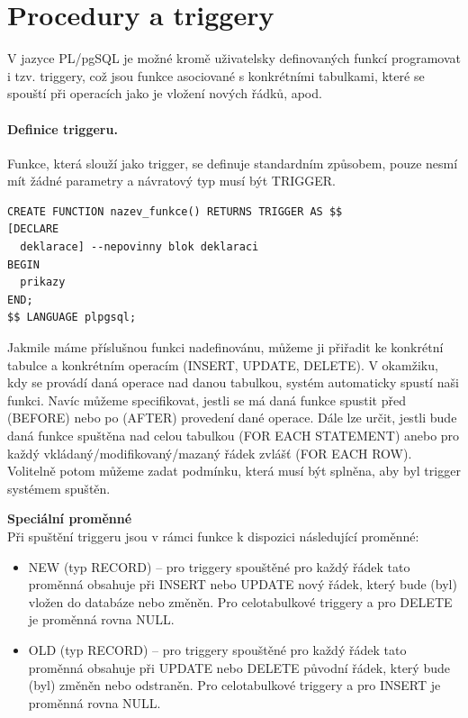 \documentclass[10pt,a4paper]{article}
\begin{document}
\section{Procedury a triggery}
V jazyce PL/pgSQL je možné kromě uživatelsky definovaných funkcí programovat i tzv. triggery, což jsou funkce asociované s konkrétními tabulkami, které se spouští při operacích jako je vložení nových řádků, apod.

\paragraph{Definice triggeru.}
Funkce, která slouží jako trigger, se definuje standardním způsobem, pouze nesmí mít žádné parametry a návratový typ musí být TRIGGER.
\begin{lstlisting}
CREATE FUNCTION nazev_funkce() RETURNS TRIGGER AS $$
[DECLARE
  deklarace] --nepovinny blok deklaraci
BEGIN
  prikazy
END;
$$ LANGUAGE plpgsql;
\end{lstlisting}
Jakmile máme příslušnou funkci nadefinovánu, můžeme ji přiřadit ke konkrétní tabulce a konkrétním operacím (INSERT, UPDATE, DELETE). V okamžiku, kdy se provádí daná operace nad danou tabulkou, systém automaticky spustí naši funkci. Navíc můžeme specifikovat, jestli se má daná funkce spustit před (BEFORE) nebo po (AFTER) provedení dané operace. Dále lze určit, jestli bude daná funkce spuštěna nad celou tabulkou (FOR EACH STATEMENT) anebo pro každý vkládaný/modifikovaný/mazaný řádek zvlášť (FOR EACH ROW). Volitelně potom můžeme zadat podmínku, která musí být splněna, aby byl trigger systémem spuštěn.

\textbf{Speciální proměnné}\\ 
Při spuštění triggeru jsou v rámci funkce k dispozici následující proměnné:
\begin{itemize}
	\item NEW (typ RECORD) – pro triggery spouštěné pro každý řádek tato proměnná obsahuje při INSERT nebo UPDATE nový řádek, který bude (byl) vložen do databáze nebo změněn. Pro celotabulkové triggery a pro DELETE je proměnná rovna NULL.
	
	\item OLD (typ RECORD) – pro triggery spouštěné pro každý řádek tato proměnná obsahuje při UPDATE nebo DELETE původní řádek, který bude (byl) změněn nebo odstraněn. Pro celotabulkové triggery a pro INSERT je proměnná rovna NULL.
\end{itemize}
\end{document}
